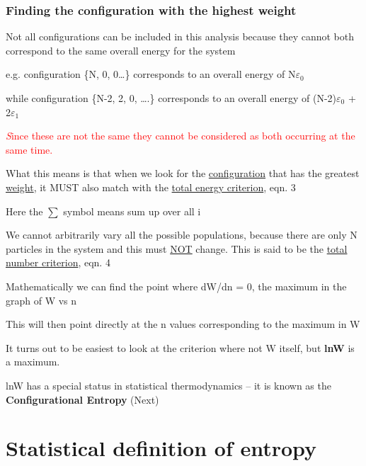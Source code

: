 \documentclass[a4paper,12pt,titlepage]{article}
\begin{document}
\begin{frame}[allowframebreaks=0.7]
\frametitle{Finding the configuration with the highest weight}
Not all configurations can be included in this analysis because they cannot both correspond to the same overall energy for the system
 
e.g. configuration \{N, 0, 0…\} corresponds to an overall energy of N\(\varepsilon_0\)
 
while configuration \{N-2, 2, 0, ….\} corresponds to an overall energy of (N-2)\(\varepsilon_0\) + 2\(\varepsilon_1\)
 
\medskip \textcolor{red}{\textit Since these are not the same they cannot be considered as both occurring at the same time.}
 
What this means is that when we look for the \underline{configuration} that has the greatest \underline{weight}, it MUST also match with the \underline{total energy criterion}, eqn. 3

\begin{center}
\end{center}

Here the \(\sum\) symbol means sum up over all i  

\medskip We cannot arbitrarily vary all the possible populations, because there are only N particles in the system and this must \underline{NOT} change. This is said to be the \underline{total number criterion}, eqn. 4  
\begin{center}
\end{center}  

Mathematically we can find the point where dW/dn = 0, the maximum in the graph of W vs n  

\medskip This will then point directly at the n values corresponding to the maximum in W

\medskip It turns out to be easiest to look at the criterion where not W itself, but \textbf{lnW} is a maximum.

\medskip lnW has a special status in statistical thermodynamics -- it is known as the \textbf{Configurational Entropy} (Next)
\end{frame}

\section{Statistical definition of entropy}
\end{document}
